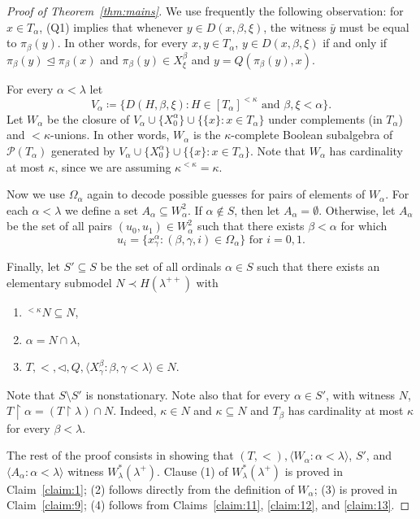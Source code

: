 \documentclass[]{amsart}
\theoremstyle{definition}
\theoremstyle{remark}
\begin{document}
\begin{proof}[Proof of Theorem~\ref{thm:mains}]
 
We use frequently the following observation: for $x \in T_\alpha$, (Q1) implies that whenever $y \in D(x, \beta, \xi)$, the witness $\bar{y}$ must be equal to $\pi_\beta(y)$. In other words, for every $x,y \in T_\alpha$, $y \in D(x, \beta, \xi)$ if and only if $\pi_\beta(y) \trianglelefteq \pi_\beta(x)$ and $\pi_\beta(y) \in X^\beta_\xi$ and $y = Q(\pi_\beta(y), x)$.


For every $\alpha < \lambda$ let
\[
V_\alpha \coloneqq \big\{D(H, \beta, \xi) : H \in [T_\alpha]^{<\kappa}  \text{ and } \beta, \xi  < \alpha\big\}.
\]
Let $W_\alpha$ be the closure of $V_\alpha \cup \{ X^\alpha_0\} \cup \{\{x\} : x \in T_\alpha\}$ under complements (in $T_\alpha$) and ${<}\kappa$-unions. In other words, $W_\alpha$ is the $\kappa$-complete Boolean subalgebra of $\mathcal{P}(T_\alpha)$ generated by $V_\alpha \cup \{ X^\alpha_0\} \cup \{\{x\} : x \in T_\alpha\}$.  Note that $W_\alpha$ has cardinality at most $\kappa$, since we are assuming $\kappa^{<\kappa} = \kappa$.

Now we use $\Omega_\alpha$ again  to decode possible guesses for pairs of elements of $W_\alpha$. For each $\alpha < \lambda$ we define a set $A_\alpha \subseteq W_\alpha^2$. If $\alpha \not\in S$, then let $A_\alpha = \emptyset$. Otherwise, let $A_\alpha$ be the set of all pairs $(u_0, u_1) \in W_\alpha^2$ such that there exists $\beta < \alpha$ for which
\[
u_i = \big\{x_\gamma^\alpha  : (\beta, \gamma, i) \in \Omega_\alpha\big\} \text{ for } i = 0,1.
\]

Finally, let $S' \subseteq S$ be the set of all ordinals $\alpha \in S$ such that there exists an elementary submodel $N \prec H(\lambda^{++})$ with
\begin{enumerate}[label={(\alph*)}]
\item ${}^{<\kappa}N \subseteq N$,
\item $\alpha = N \cap \lambda$,
\item $T, {<}, {\lhd},Q, \langle X^\beta_\gamma:\beta, \gamma <\lambda\rangle\in N$.
\end{enumerate}
Note that $S \setminus S'$ is nonstationary. Note also that for every $\alpha \in S'$, with witness $N$, $T \upharpoonright \alpha = (T \upharpoonright \lambda) \cap N$. Indeed, $\kappa \in N$ and $\kappa \subseteq N$ and $T_\beta$ has cardinality at most $\kappa$ for every $\beta < \lambda$. 

The rest of the proof consists in showing that $(T,<), \langle W_\alpha : \alpha < \lambda\rangle$, $S'$, and $\langle A_\alpha : \alpha < \lambda\rangle$ witness $W^*_{\lambda}(\lambda^+)$. Clause (1) of  $W^*_{\lambda}(\lambda^+)$ is proved in Claim~\ref{claim:1}; (2) follows directly from the definition of $W_\alpha$; (3) is proved in Claim~\ref{claim:9}; (4) follows from Claims~\ref{claim:11}, \ref{claim:12}, and \ref{claim:13}.


\end{proof}
\end{document}

